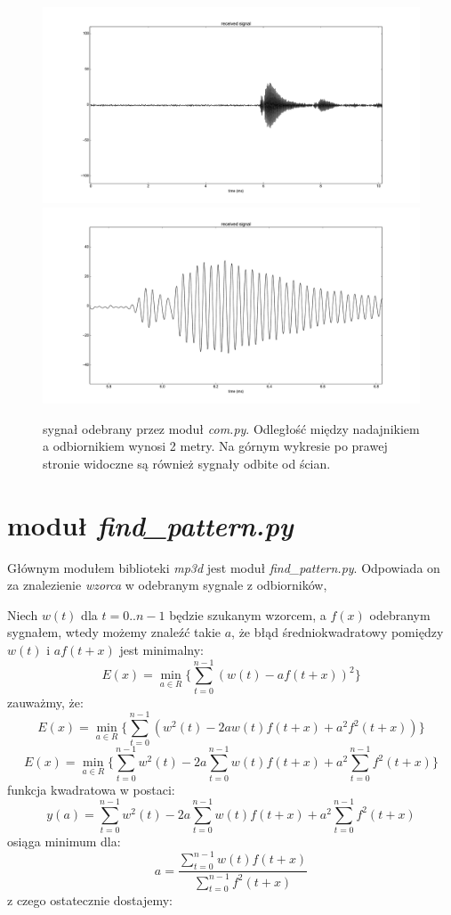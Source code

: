 \begin{figure}[h!]
    \centering
    \includegraphics[width=1.15\textwidth, trim= 47mm 0mm 0mm 0mm,clip]{com_output_2m_1}
    \includegraphics[width=1.15\textwidth, trim= 47mm 0mm 0mm 0mm,clip]{com_output_2m_2}
    \caption{sygnał odebrany przez moduł \textit{com.py}. 
    Odległość między nadajnikiem a odbiornikiem wynosi 2 metry.
    Na górnym wykresie po prawej stronie widoczne są również sygnały odbite od ścian.
    }
    \label{fig:com_output_2m}
\end{figure}


\section{moduł \textit{find\_pattern.py}}

Głównym modułem biblioteki \textit{mp3d} jest moduł \textit{find\_pattern.py}.
Odpowiada on za znalezienie \textit{wzorca} w odebranym sygnale z odbiorników,

Niech $w(t)$  dla $t = 0..n-1$ będzie szukanym wzorcem, a $f(x)$ odebranym sygnałem,
wtedy możemy znaleźć takie $a$, że błąd średniokwadratowy pomiędzy $w(t)$ i $a f(t+x)$ jest minimalny:
\[
  E(x) = \min_{a \in R} \{ \sum_{t=0}^{n-1}  (w(t) - a f(t+x))^2 \}
\]
zauważmy, że:
\[
  E(x) = \min_{a \in R} \{ \sum_{t=0}^{n-1}  (w^2(t) -2a w(t) f(t+x) + a^2 f^2(t+x)) \}
\]
\[
  E(x) = \min_{a \in R} \{ \sum_{t=0}^{n-1}  w^2(t) -2a \sum_{t=0}^{n-1}  w(t) f(t+x) + a^2 \sum_{t=0}^{n-1} f^2(t+x) \}
\]
funkcja kwadratowa w postaci:
\[
  y(a) = \sum_{t=0}^{n-1}  w^2(t) -2a \sum_{t=0}^{n-1}  w(t) f(t+x) + a^2 \sum_{t=0}^{n-1} f^2(t+x)
\]
osiąga minimum dla:
\[
 a = \frac{ \sum\limits_{t=0}^{n-1}  w(t) f(t+x) }{ \sum\limits_{t=0}^{n-1} f^2(t+x) }
\]
z czego ostatecznie dostajemy:

